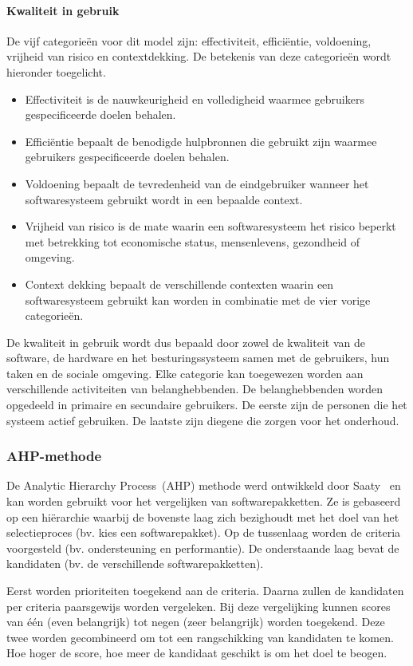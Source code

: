 \paragraph{Kwaliteit in gebruik}
De vijf categorieën voor dit model zijn: effectiviteit,  efficiëntie,  voldoening,  vrijheid van risico en contextdekking. 
De betekenis van deze categorieën wordt hieronder toegelicht.
\begin{itemize}
 \item Effectiviteit is de nauwkeurigheid en volledigheid waarmee gebruikers gespecificeerde doelen behalen.
 \item Efficiëntie bepaalt de benodigde hulpbronnen die gebruikt zijn waarmee gebruikers gespecificeerde doelen behalen.
 \item Voldoening bepaalt de tevredenheid van de eindgebruiker wanneer het softwaresysteem gebruikt wordt in een bepaalde context.
 \item Vrijheid van risico is de mate waarin een softwaresysteem het risico beperkt met betrekking tot economische status, mensenlevens, gezondheid of omgeving.
 \item Context dekking bepaalt de verschillende contexten waarin een softwaresysteem gebruikt kan worden in combinatie met de vier vorige categorieën.
\end{itemize}
De kwaliteit in gebruik wordt dus bepaald door zowel de kwaliteit van de software,  de hardware en het besturingssysteem samen met de gebruikers, hun taken en de sociale omgeving.  
Elke categorie kan toegewezen worden aan verschillende activiteiten van belanghebbenden. 
De belanghebbenden worden opgedeeld in primaire en secundaire gebruikers.  
De eerste zijn de personen die het systeem actief gebruiken. 
De laatste zijn diegene die zorgen voor het onderhoud.

\subsubsection{AHP-methode}
\label{sec:vergelijken-ahp}
De Analytic Hierarchy Process~(AHP) methode werd ontwikkeld door Saaty~\cite{Saaty1980} en kan worden gebruikt voor het vergelijken van softwarepakketten.
Ze is gebaseerd op een hiërarchie waarbij de bovenste laag zich bezighoudt met het doel van het selectieproces (bv. kies een softwarepakket).
Op de tussenlaag worden de criteria voorgesteld (bv. ondersteuning en performantie).
De onderstaande laag bevat de kandidaten (bv. de verschillende softwarepakketten).

Eerst worden prioriteiten toegekend aan de criteria.
Daarna zullen de kandidaten per criteria paarsgewijs worden vergeleken.
Bij deze vergelijking kunnen scores van één (even belangrijk) tot negen (zeer belangrijk) worden toegekend.
Deze twee worden gecombineerd om tot een rangschikking van kandidaten te komen.
Hoe hoger de score, hoe meer de kandidaat geschikt is om het doel te beogen.

